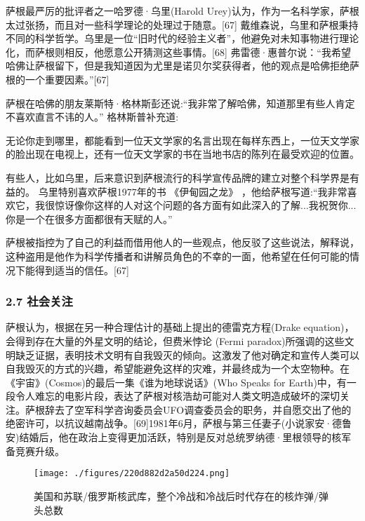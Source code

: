 萨根最严厉的批评者之一哈罗德·乌里(Harold Urey)认为，作为一名科学家，萨根太过张扬，而且对一些科学理论的处理过于随意。[67] 戴维森说，乌里和萨根秉持不同的科学哲学。乌里是一位“旧时代的经验主义者”，他避免对未知事物进行理论化，而萨根则相反，他愿意公开猜测这些事情。[68] 弗雷德·惠普尔说：“我希望哈佛让萨根留下，但是我知道因为尤里是诺贝尔奖获得者，他的观点是哈佛拒绝萨根的一个重要因素。”[67]

萨根在哈佛的朋友莱斯特·格林斯彭还说:“我非常了解哈佛，知道那里有些人肯定不喜欢直言不讳的人。” 格林斯普补充道:

无论你走到哪里，都能看到一位天文学家的名言出现在每样东西上，一位天文学家的脸出现在电视上，还有一位天文学家的书在当地书店的陈列在最受欢迎的位置。

有些人，比如乌里，后来意识到萨根流行的科学宣传品牌的建立对整个科学界是有益的。 乌里特别喜欢萨根1977年的书 《伊甸园之龙》 ，他给萨根写道:“我非常喜欢它，我很惊讶像你这样的人对这个问题的各方面有如此深入的了解...我祝贺你...你是一个在很多方面都很有天赋的人。”

萨根被指控为了自己的利益而借用他人的一些观点，他反驳了这些说法，解释说，这种盗用是他作为科学传播者和讲解员角色的不幸的一面，他希望在任何可能的情况下能得到适当的信任。[67]
\subsubsection{2.7 社会关注}
萨根认为，根据在另一种合理估计的基础上提出的德雷克方程(Drake equation)，会得到存在大量的外星文明的结论，但费米悖论 (Fermi paradox)所强调的这些文明缺乏证据，表明技术文明有自我毁灭的倾向。这激发了他对确定和宣传人类可以自我毁灭的方式的兴趣，希望能避免这样的灾难，并最终成为一个太空物种。在《宇宙》(Cosmos)的最后一集《谁为地球说话》(Who Speaks for Earth)中，有一段令人难忘的电影片段，表达了萨根对核浩劫可能对人类文明造成破坏的深切关注。萨根辞去了空军科学咨询委员会UFO调查委员会的职务，并自愿交出了他的绝密许可，以抗议越南战争。[69]1981年6月，萨根与第三任妻子(小说家安·德鲁安)结婚后，他在政治上变得更加活跃，特别是反对总统罗纳德·里根领导的核军备竞赛升级。
\begin{figure}[ht]
\centering
\texttt{[image: ./figures/220d882d2a50d224.png]}
\caption{美国和苏联/俄罗斯核武库，整个冷战和冷战后时代存在的核炸弹/弹头总数} \label{fig_Sagan_8}
\end{figure}